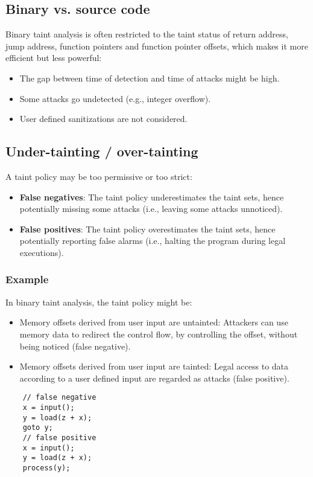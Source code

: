 \documentclass[a4paper, 10pt, titlepage]{article}
\begin{document}
\subsection{Binary vs. source code}
Binary taint analysis is often restricted to the taint status of return address, jump address, function pointers and function pointer offsets, which makes it more efficient but less powerful:
\begin{itemize}
\item The gap between time of detection and time of attacks might be
high.
\item Some attacks go undetected (e.g., integer overflow).
\item User defined sanitizations are not considered.
\end{itemize}

\subsection{Under-tainting / over-tainting}
A taint policy may be too permissive or too strict:
\begin{itemize}
\item \textbf{False negatives}: The taint policy underestimates the taint sets, hence potentially missing some attacks (i.e., leaving some attacks unnoticed).
\item \textbf{False positives}: The taint policy overestimates the taint sets, hence potentially reporting false alarms (i.e., halting the program during legal executions).
\end{itemize}

\subsubsection*{Example}
In binary taint analysis, the taint policy might be:
\begin{itemize}
\item Memory offsets derived from user input are untainted: Attackers can use memory data to redirect the control flow, by controlling the offset, without being noticed (false negative).
\item Memory offsets derived from user input are tainted: Legal access to data according to a user defined input are regarded as attacks (false positive).
\end{itemize}
\begin{lstlisting}
	// false negative
	x = input();
	y = load(z + x);
	goto y;
	// false positive
	x = input();
	y = load(z + x);
	process(y);
\end{lstlisting}
\end{document}
